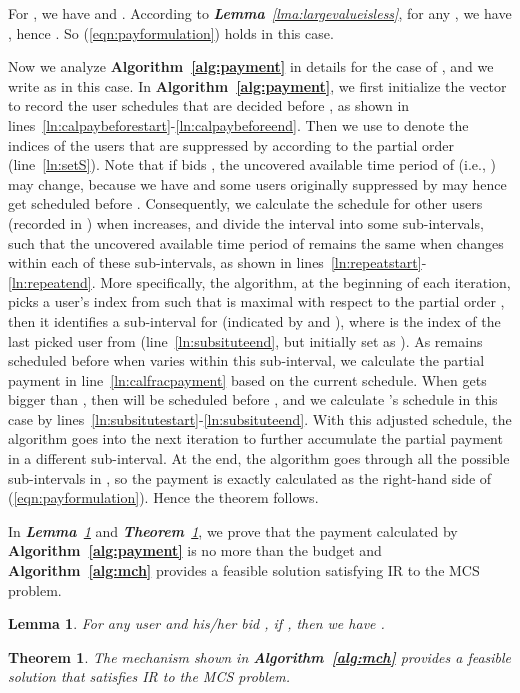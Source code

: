 \documentclass[10pt,journal,compsoc]{IEEEtran}
\newtheorem{theorem}{\textbf{Theorem}}
\newtheorem{lemma}{\textbf{Lemma}}
\begin{document}
  \begin{IEEEproof}
    For , we have  and . According to \textit{\textbf{Lemma}~\ref{lma:largevalueisless}}, for any , we have , hence . So (\ref{eqn:payformulation}) holds in this case.

    Now we analyze \textbf{Algorithm~\ref{alg:payment}} in details for the case of , and we write  as  in this case. In \textbf{Algorithm~\ref{alg:payment}}, we first initialize the vector  to record the user schedules that are decided before , as shown in lines~\ref{ln:calpaybeforestart}-\ref{ln:calpaybeforeend}. Then we use  to denote the indices of the users that are suppressed by  according to the partial order  (line~\ref{ln:setS}). Note that if  bids , the uncovered available time period of  (i.e., ) may change, because we have  and some users originally suppressed by  may hence get scheduled before . Consequently, we calculate the schedule for other users (recorded in ) when  increases, and divide the interval  into some sub-intervals, such that the uncovered available time period of  remains the same when  changes  within each of these sub-intervals, as shown in lines~\ref{ln:repeatstart}-\ref{ln:repeatend}. More specifically, the algorithm, at the beginning of each iteration, picks a user's index  from  such that  is maximal with respect to the partial order , then it identifies a sub-interval  for  (indicated by  and ), where  is the index of the last picked user from  (line~\ref{ln:subsituteend}, but initially set as ). As  remains scheduled before  when  varies within this sub-interval, we calculate the partial payment in line~\ref{ln:calfracpayment} based on the current schedule. When  gets bigger than , then  will be scheduled before , and we calculate 's schedule in this case by lines~\ref{ln:subsitutestart}-\ref{ln:subsituteend}. With this adjusted schedule, the algorithm goes into the next iteration to further accumulate the partial payment in a different sub-interval.
At the end, the algorithm goes through all the possible sub-intervals in , so the payment is exactly calculated as the right-hand side of (\ref{eqn:payformulation}). Hence the theorem follows.
  \end{IEEEproof}









  In \textit{\textbf{Lemma}~\ref{lma:biddingbound}} and \textit{\textbf{Theorem}~\ref{thm:correctmch}}, we prove that the payment calculated by \textbf{Algorithm~\ref{alg:payment}} is no more than the budget  and \textbf{Algorithm~\ref{alg:mch}} provides a feasible solution satisfying IR to the MCS problem.
\begin{lemma}
    For any user  and his/her bid , if , then we have .
    \label{lma:biddingbound}
  \end{lemma}
\begin{theorem}
    The mechanism shown in \textbf{Algorithm~\ref{alg:mch}} provides a feasible solution that satisfies IR to the MCS problem.
    \label{thm:correctmch}
  \end{theorem}
\end{document}
